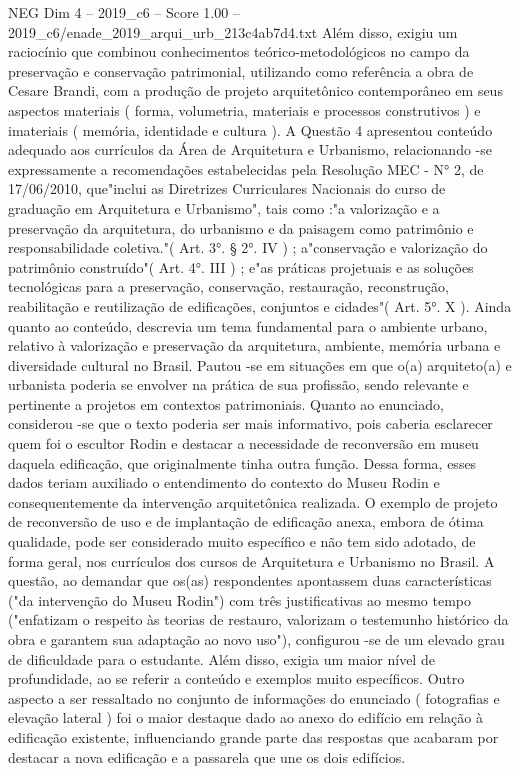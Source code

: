 \begin{textsample}{NEG Dim 4 – 2019\_c6 – Score 1.00 – 2019\_c6/enade\_2019\_arqui\_urb\_213c4ab7d4.txt}
Além disso, exigiu um raciocínio que combinou conhecimentos teórico-metodológicos no campo da preservação e conservação patrimonial, utilizando como referência a obra de Cesare Brandi, com a produção de projeto arquitetônico contemporâneo em seus aspectos materiais ( forma, volumetria, materiais e processos construtivos ) e imateriais ( memória, identidade e cultura ).
A Questão 4 apresentou conteúdo adequado aos currículos da Área de Arquitetura e Urbanismo, relacionando -se expressamente a recomendações estabelecidas pela Resolução MEC - N{\EmojiFont °} 2, de 17/06/2010, que"inclui as Diretrizes Curriculares Nacionais do curso de graduação em Arquitetura e Urbanismo", tais como :"a valorização e a preservação da arquitetura, do urbanismo e da paisagem como patrimônio e responsabilidade coletiva."( Art. 3{\EmojiFont °}. § 2{\EmojiFont °}.
IV ) ; a"conservação e valorização do patrimônio construído"( Art. 4{\EmojiFont °}.
III ) ; e"as práticas projetuais e as soluções tecnológicas para a preservação, conservação, restauração, reconstrução, reabilitação e reutilização de edificações, conjuntos e cidades"( Art. 5{\EmojiFont °}.
X ).
Ainda quanto ao conteúdo, descrevia um tema fundamental para o ambiente urbano, relativo à valorização e preservação da arquitetura, ambiente, memória urbana e diversidade cultural no Brasil.
Pautou -se em situações em que o(a) arquiteto(a) e urbanista poderia se envolver na prática de sua profissão, sendo relevante e pertinente a projetos em contextos patrimoniais.
Quanto ao enunciado, considerou -se que o texto poderia ser mais informativo, pois caberia esclarecer quem foi o escultor Rodin e destacar a necessidade de reconversão em museu daquela edificação, que originalmente tinha outra função.
Dessa forma, esses dados teriam auxiliado o entendimento do contexto do Museu Rodin e consequentemente da intervenção arquitetônica realizada.
O exemplo de projeto de reconversão de uso e de implantação de edificação anexa, embora de ótima qualidade, pode ser considerado muito específico e não tem sido adotado, de forma geral, nos currículos dos cursos de Arquitetura e Urbanismo no Brasil.
A questão, ao demandar que os(as) respondentes apontassem duas características ("da intervenção do Museu Rodin") com três justificativas ao mesmo tempo ("enfatizam o respeito às teorias de restauro, valorizam o testemunho histórico da obra e garantem sua adaptação ao novo uso"), configurou -se de um elevado grau de dificuldade para o estudante.
Além disso, exigia um maior nível de profundidade, ao se referir a conteúdo e exemplos muito específicos.
Outro aspecto a ser ressaltado no conjunto de informações do enunciado ( fotografias e elevação lateral ) foi o maior destaque dado ao anexo do edifício em relação à edificação existente, influenciando grande parte das respostas que acabaram por destacar a nova edificação e a passarela que une os dois edifícios.

\end{textsample}
